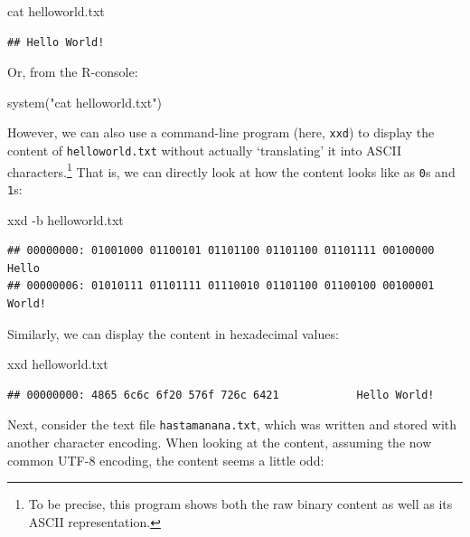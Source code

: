 \documentclass[
  12pt,
]{style/krantz}
\newenvironment{Shaded}{\begin{snugshade}}{\end{snugshade}}
\newcommand{\AttributeTok}[1]{\textcolor[rgb]{0.77,0.63,0.00}{#1}}
\newcommand{\ExtensionTok}[1]{#1}
\newcommand{\FunctionTok}[1]{\textcolor[rgb]{0.00,0.00,0.00}{#1}}
\newcommand{\NormalTok}[1]{#1}
\newcommand{\StringTok}[1]{\textcolor[rgb]{0.31,0.60,0.02}{#1}}
\begin{document}
\begin{Shaded}
\begin{Highlighting}[]
\FunctionTok{cat}\NormalTok{ helloworld.txt}
\end{Highlighting}
\end{Shaded}

\begin{verbatim}
## Hello World!
\end{verbatim}

Or, from the R-console:

\begin{Shaded}
\begin{Highlighting}[]
\FunctionTok{system}\NormalTok{(}\StringTok{"cat helloworld.txt"}\NormalTok{)}
\end{Highlighting}
\end{Shaded}

However, we can also use a command-line program (here, \texttt{xxd}) to display the content of \texttt{helloworld.txt} without actually `translating' it into ASCII characters.\footnote{To be precise, this program shows both the raw binary content as well as its ASCII representation.} That is, we can directly look at how the content looks like as \texttt{0}s and \texttt{1}s:

\begin{Shaded}
\begin{Highlighting}[]
\ExtensionTok{xxd} \AttributeTok{{-}b}\NormalTok{ helloworld.txt}
\end{Highlighting}
\end{Shaded}

\begin{verbatim}
## 00000000: 01001000 01100101 01101100 01101100 01101111 00100000  Hello 
## 00000006: 01010111 01101111 01110010 01101100 01100100 00100001  World!
\end{verbatim}

Similarly, we can display the content in hexadecimal values:

\begin{Shaded}
\begin{Highlighting}[]
\ExtensionTok{xxd}\NormalTok{  helloworld.txt}
\end{Highlighting}
\end{Shaded}

\begin{verbatim}
## 00000000: 4865 6c6c 6f20 576f 726c 6421            Hello World!
\end{verbatim}

Next, consider the text file \texttt{hastamanana.txt}, which was written and stored with another character encoding. When looking at the content, assuming the now common UTF-8 encoding, the content seems a little odd:
\end{document}
